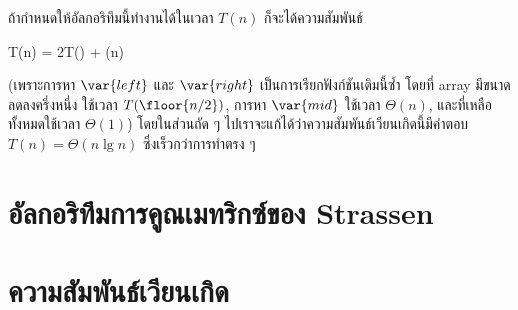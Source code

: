 ถ้ากำหนดให้อัลกอริทึมนี้ทำงานได้ในเวลา $T(n)$ ก็จะได้ความสัมพันธ์
\begin{eqnobox}
    T(n) = 2T() + \Theta(n)
\end{eqnobox}
(เพราะการหา $\var{left}$ และ $\var{right}$ เป็นการเรียกฟังก์ชันเดิมนี้ซ้ำ โดยที่ array มีขนาดลดลงครึ่งหนึ่ง ใช้เวลา $T(\floor{n/2})$, การหา $\var{mid}$ ใช้เวลา $\Theta(n)$, และที่เหลือทั้งหมดใช้เวลา $\Theta(1)$) โดยในส่วนถัด ๆ ไปเราจะแก้ได้ว่าความสัมพันธ์เวียนเกิดนี้มีคำตอบ $T(n) = \Theta(n\lg n)$ ซึ่งเร็วกว่าการทำตรง ๆ

\section{อัลกอริทึมการคูณเมทริกซ์ของ Strassen}

\section{ความสัมพันธ์เวียนเกิด}